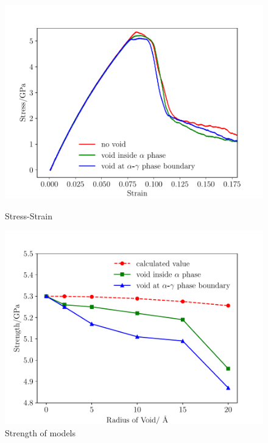 \documentclass[metals,article,submit,moreauthors,pdftex,10pt,a4paper]{Definitions/mdpi}
\begin{document}
\begin{figure}[ht]
	\centering
	\begin{minipage}{0.495\textwidth}
		\includegraphics[width=1\linewidth]{img/allline}
		\centering
		\caption{Stress-Strain}
		\label{fig:stress&strain}
	\end{minipage}	
	\hfill
	\begin{minipage}{0.495\textwidth}		
		\includegraphics[width=1\linewidth]{img/effect_of_vol}
		\centering
		\caption{Strength of models}
		\label{fig:strength}
	\end{minipage}
\end{figure}


	
\end{document}
